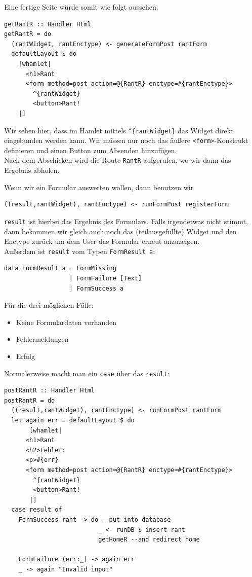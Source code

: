 \documentclass{beamer}
\begin{document}
\begin{frame}[fragile]
Eine fertige Seite würde somit wie folgt aussehen:
\begin{verbatim}
getRantR :: Handler Html
getRantR = do
  (rantWidget, rantEnctype) <- generateFormPost rantForm
  defaultLayout $ do
    [whamlet|
      <h1>Rant
      <form method=post action=@{RantR} enctype=#{rantEnctype}>
        ^{rantWidget}
        <button>Rant!
    |]
\end{verbatim}
\pause
Wir sehen hier, dass im Hamlet mittels \texttt{\textasciicircum\{rantWidget\}} das Widget direkt eingebunden werden kann. Wir müssen nur noch das äußere \texttt{<form>}-Konstrukt definieren und einen Button zum Absenden hinzufügen.\\\pause
Nach dem Abschicken wird die Route \texttt{RantR} aufgerufen, wo wir dann das Ergebnis abholen.

\end{frame}

\begin{frame}[fragile]
Wenn wir ein Formular auswerten wollen, dann benutzen wir
\begin{verbatim}
((result,rantWidget), rantEnctype) <- runFormPost registerForm
\end{verbatim}
\pause
\texttt{result} ist hierbei das Ergebnis des Formulars. Falls irgendetwas nicht stimmt, dann bekommen wir gleich auch noch das (teilausgefüllte) Widget und den Enctype zurück um dem User das Formular erneut anzuzeigen.\\\pause
Außerdem ist \texttt{result} vom Typen \texttt{FormResult a}:
\begin{verbatim}
data FormResult a = FormMissing
                  | FormFailure [Text]
                  | FormSuccess a
\end{verbatim}
\pause
Für die drei möglichen Fälle:
\begin{itemize}
 \item Keine Formulardaten vorhanden
 \item Fehlermeldungen
 \item Erfolg
\end{itemize}
\end{frame}

\begin{frame}[fragile]
Normalerweise macht man ein \texttt{case} über das \texttt{result}:
\begin{verbatim}
postRantR :: Handler Html
postRantR = do
  ((result,rantWidget), rantEnctype) <- runFormPost rantForm
  let again err = defaultLayout $ do
       [whamlet|
      <h1>Rant
      <h2>Fehler:
      <p>#{err}
      <form method=post action=@{RantR} enctype=#{rantEnctype}>
        ^{rantWidget}
        <button>Rant!
       |]
  case result of
    FormSuccess rant -> do --put into database
                          _ <- runDB $ insert rant
                          getHomeR --and redirect home
                 
    FormFailure (err:_) -> again err
    _ -> again "Invalid input"
\end{verbatim}

\end{frame}
\end{document}
